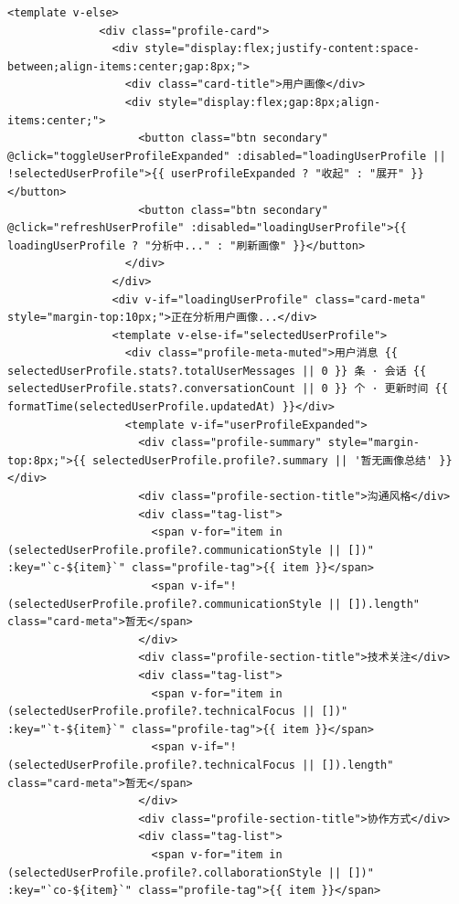 \documentclass[12pt,a4paper]{article}
\begin{document}
\newpage
{}
\fancyhead[R]{}
\begin{Verbatim}[fontsize=\footnotesize]
            <template v-else>
              <div class="profile-card">
                <div style="display:flex;justify-content:space-between;align-items:center;gap:8px;">
                  <div class="card-title">用户画像</div>
                  <div style="display:flex;gap:8px;align-items:center;">
                    <button class="btn secondary" @click="toggleUserProfileExpanded" :disabled="loadingUserProfile || !selectedUserProfile">{{ userProfileExpanded ? "收起" : "展开" }}</button>
                    <button class="btn secondary" @click="refreshUserProfile" :disabled="loadingUserProfile">{{ loadingUserProfile ? "分析中..." : "刷新画像" }}</button>
                  </div>
                </div>
                <div v-if="loadingUserProfile" class="card-meta" style="margin-top:10px;">正在分析用户画像...</div>
                <template v-else-if="selectedUserProfile">
                  <div class="profile-meta-muted">用户消息 {{ selectedUserProfile.stats?.totalUserMessages || 0 }} 条 · 会话 {{ selectedUserProfile.stats?.conversationCount || 0 }} 个 · 更新时间 {{ formatTime(selectedUserProfile.updatedAt) }}</div>
                  <template v-if="userProfileExpanded">
                    <div class="profile-summary" style="margin-top:8px;">{{ selectedUserProfile.profile?.summary || '暂无画像总结' }}</div>
                    <div class="profile-section-title">沟通风格</div>
                    <div class="tag-list">
                      <span v-for="item in (selectedUserProfile.profile?.communicationStyle || [])" :key="`c-${item}`" class="profile-tag">{{ item }}</span>
                      <span v-if="!(selectedUserProfile.profile?.communicationStyle || []).length" class="card-meta">暂无</span>
                    </div>
                    <div class="profile-section-title">技术关注</div>
                    <div class="tag-list">
                      <span v-for="item in (selectedUserProfile.profile?.technicalFocus || [])" :key="`t-${item}`" class="profile-tag">{{ item }}</span>
                      <span v-if="!(selectedUserProfile.profile?.technicalFocus || []).length" class="card-meta">暂无</span>
                    </div>
                    <div class="profile-section-title">协作方式</div>
                    <div class="tag-list">
                      <span v-for="item in (selectedUserProfile.profile?.collaborationStyle || [])" :key="`co-${item}`" class="profile-tag">{{ item }}</span>

\end{Verbatim}
\end{document}
